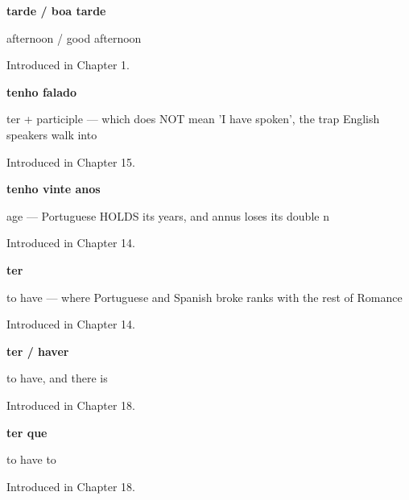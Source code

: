 \noindent\begin{minipage}[t]{\linewidth}
\raggedright
\textbf{tarde / boa tarde}\par
\small afternoon / good afternoon\par
\footnotesize Introduced in Chapter 1.
\end{minipage}\par\medskip

\noindent\begin{minipage}[t]{\linewidth}
\raggedright
\textbf{tenho falado}\par
\small ter + participle — which does NOT mean 'I have spoken', the trap English speakers walk into\par
\footnotesize Introduced in Chapter 15.
\end{minipage}\par\medskip

\noindent\begin{minipage}[t]{\linewidth}
\raggedright
\textbf{tenho vinte anos}\par
\small age — Portuguese HOLDS its years, and annus loses its double n\par
\footnotesize Introduced in Chapter 14.
\end{minipage}\par\medskip

\noindent\begin{minipage}[t]{\linewidth}
\raggedright
\textbf{ter}\par
\small to have — where Portuguese and Spanish broke ranks with the rest of Romance\par
\footnotesize Introduced in Chapter 14.
\end{minipage}\par\medskip

\noindent\begin{minipage}[t]{\linewidth}
\raggedright
\textbf{ter / haver}\par
\small to have, and there is\par
\footnotesize Introduced in Chapter 18.
\end{minipage}\par\medskip

\noindent\begin{minipage}[t]{\linewidth}
\raggedright
\textbf{ter que}\par
\small to have to\par
\footnotesize Introduced in Chapter 18.
\end{minipage}\par\medskip

